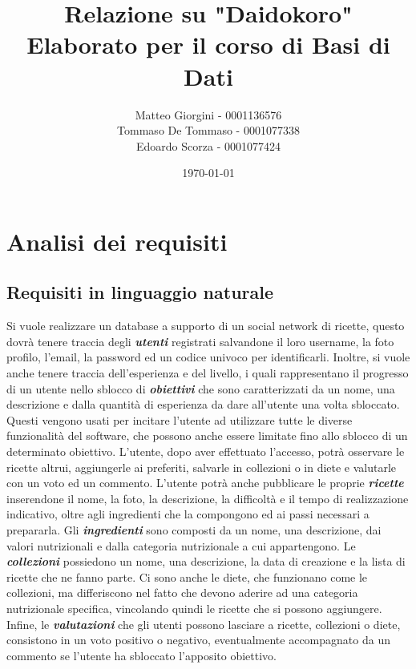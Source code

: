 ﻿\documentclass[a4paper,12pt]{report}
\title{Relazione su "Daidokoro" \\ Elaborato per il corso di Basi di Dati}
\author
{
    Matteo Giorgini - 0001136576 \\
    Tommaso De Tommaso - 0001077338 \\
    Edoardo Scorza - 0001077424 \\
}
\date{\today}
\begin{document}
\maketitle
\tableofcontents
\chapter{Analisi dei requisiti}
\section{Requisiti in linguaggio naturale}
Si vuole realizzare un database a supporto di un social network di ricette, questo dovrà tenere traccia degli \textbf{\textit{utenti}} registrati salvandone il loro username, la foto profilo, l'email, la password ed un codice univoco per identificarli.
Inoltre, si vuole anche tenere traccia dell'esperienza e del livello, i quali rappresentano il progresso di un utente nello sblocco di \textbf{\textit{obiettivi}} che sono caratterizzati da un nome, una descrizione e dalla quantità di esperienza da dare all'utente una volta sbloccato.
Questi vengono usati per incitare l'utente ad utilizzare tutte le diverse funzionalità del software, che possono anche essere limitate fino allo sblocco di un determinato obiettivo.
L'utente, dopo aver effettuato l'accesso, potrà osservare le ricette altrui, aggiungerle ai preferiti, salvarle in collezioni o in diete e valutarle con un voto ed un commento.
L'utente potrà anche pubblicare le proprie \textbf{\textit{ricette}} inserendone il nome, la foto, la descrizione, la difficoltà e il tempo di realizzazione indicativo, oltre agli ingredienti che la compongono ed ai passi necessari a prepararla.
Gli \textbf{\textit{ingredienti}} sono composti da un nome, una descrizione, dai valori nutrizionali e dalla categoria nutrizionale a cui appartengono.
Le \textbf{\textit{collezioni}} possiedono un nome, una descrizione, la data di creazione e la lista di ricette che ne fanno parte.
Ci sono anche le diete, che funzionano come le collezioni, ma differiscono nel fatto che devono aderire ad una categoria nutrizionale specifica, vincolando quindi le ricette che si possono aggiungere.
Infine, le \textbf{\textit{valutazioni}} che gli utenti possono lasciare a ricette, collezioni o diete, consistono in un voto positivo o negativo, eventualmente accompagnato da un commento se l'utente ha sbloccato l'apposito obiettivo.
\\
\end{document}
